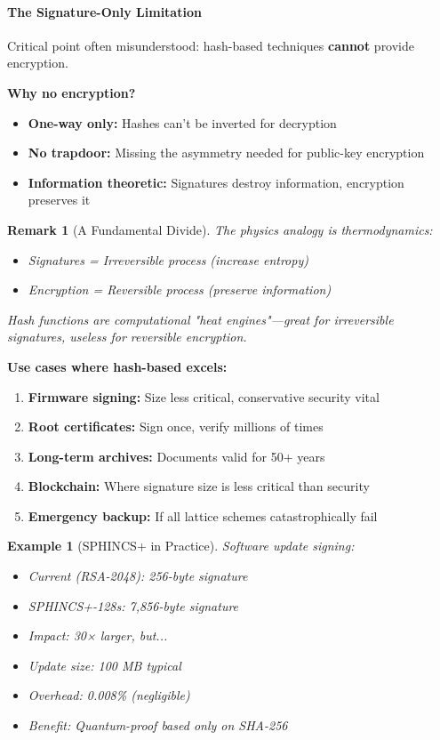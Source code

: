 \documentclass[11pt,a4paper]{article}
\newtheorem{example}{Example}
\newtheorem{remark}{Remark}
\begin{document}
\paragraph{The Signature-Only Limitation}

Critical point often misunderstood: hash-based techniques \textbf{cannot} provide encryption.

\textbf{Why no encryption?}
\begin{itemize}
    \item \textbf{One-way only:} Hashes can't be inverted for decryption
    \item \textbf{No trapdoor:} Missing the asymmetry needed for public-key encryption
    \item \textbf{Information theoretic:} Signatures destroy information, encryption preserves it
\end{itemize}

\begin{remark}[A Fundamental Divide]
The physics analogy is thermodynamics:
\begin{itemize}
    \item Signatures = Irreversible process (increase entropy)
    \item Encryption = Reversible process (preserve information)
\end{itemize}
Hash functions are computational "heat engines"—great for irreversible signatures, useless for reversible encryption.
\end{remark}

\textbf{Use cases where hash-based excels:}
\begin{enumerate}
    \item \textbf{Firmware signing:} Size less critical, conservative security vital
    \item \textbf{Root certificates:} Sign once, verify millions of times
    \item \textbf{Long-term archives:} Documents valid for 50+ years
    \item \textbf{Blockchain:} Where signature size is less critical than security
    \item \textbf{Emergency backup:} If all lattice schemes catastrophically fail
\end{enumerate}

\begin{example}[SPHINCS+ in Practice]
Software update signing:
\begin{itemize}
    \item Current (RSA-2048): 256-byte signature
    \item SPHINCS+-128s: 7,856-byte signature
    \item Impact: 30× larger, but...
    \item Update size: 100 MB typical
    \item Overhead: 0.008\% (negligible)
    \item Benefit: Quantum-proof based only on SHA-256
\end{itemize}
\end{example}
\end{document}
